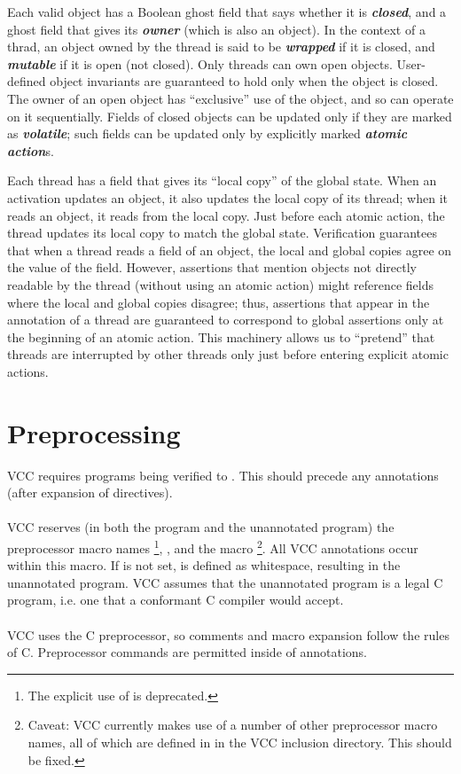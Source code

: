 \documentclass[preprint,nocopyrightspace]{sigplanconf}
\newcommand{\Def}[1]{\textit{\textbf{#1}}}
\begin{document}
Each valid object has a Boolean ghost field that says whether it
is \Def{closed}, and a ghost field that gives its \Def{owner} (which
is also an object). In the context of a thrad, an object owned by the
thread is said to be \Def{wrapped} if it is closed, and \Def{mutable}
if it is open (not closed). Only threads can own open objects.
User-defined object invariants are guaranteed to hold only when the
object is closed. The owner of an open object has ``exclusive'' use of
the object, and so can operate on it sequentially.  Fields of closed
objects can be updated only if they are marked as \Def{volatile}; such
fields can be updated only by explicitly marked \Def{atomic action}s.

Each thread has a field that gives its ``local copy'' of the global state.
When an activation updates an object, it also updates the local copy
of its thread; when it reads an object, it reads from the local copy. 
Just before each atomic action, the thread updates its local copy to
match the global state. Verification guarantees that when a thread
reads a field of an object, the local and global copies agree on the
value of the field. However, assertions that mention objects not
directly readable by the thread (without using an atomic action) might
reference fields where the local and global copies disagree; thus,
assertions that appear in the annotation of a thread are guaranteed to
correspond to global assertions only at the beginning of an atomic
action. This machinery allows us to ``pretend'' that threads are
interrupted by other threads only just before entering explicit atomic
actions. 

\section{Preprocessing}

VCC requires programs being verified to . This
should precede any annotations (after expansion of 
directives). 
\\\\
VCC reserves (in both the program and the unannotated program) the
preprocessor macro names \footnote{ The explicit use
of  is deprecated.  }, , and the
macro \footnote{ Caveat: VCC currently makes use of a
number of other preprocessor macro names, all of which are defined
in  in the VCC inclusion directory. This should be
fixed.  }.  All VCC annotations occur within this
macro. If  is not set, \vcc{_()} is defined as whitespace,
resulting in the unannotated program. VCC assumes that the unannotated
program is a legal C program, i.e. one that a conformant C compiler
would accept.
\\\\
VCC uses the C preprocessor, so comments and macro expansion follow
the rules of C. Preprocessor commands are permitted inside of annotations.
\end{document}
